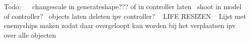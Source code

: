Todo\+:~\newline
~\newline
 changescale in generateshape??? of in controller laten~\newline
 shoot in model of controller?~\newline
 objects laten deleten ipv controller? ~\newline
 L\+I\+FE R\+E\+S\+I\+Z\+EN ~\newline
 Lijst met enemyships maken zodat daar overgeloopt kan worden bij het verplaatsen ipv over alle objecten ~\newline
 